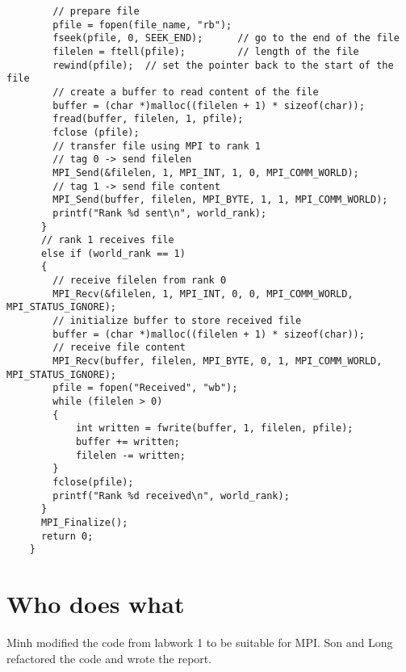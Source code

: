 \documentclass[12pt]{article}
\begin{document}
\begin{verbatim}
        // prepare file
        pfile = fopen(file_name, "rb");
        fseek(pfile, 0, SEEK_END);      // go to the end of the file
        filelen = ftell(pfile);         // length of the file
        rewind(pfile);  // set the pointer back to the start of the file 
        // create a buffer to read content of the file
        buffer = (char *)malloc((filelen + 1) * sizeof(char)); 
        fread(buffer, filelen, 1, pfile);
        fclose (pfile); 
        // transfer file using MPI to rank 1
        // tag 0 -> send filelen 
        MPI_Send(&filelen, 1, MPI_INT, 1, 0, MPI_COMM_WORLD);
        // tag 1 -> send file content
        MPI_Send(buffer, filelen, MPI_BYTE, 1, 1, MPI_COMM_WORLD);
        printf("Rank %d sent\n", world_rank);
      }
      // rank 1 receives file 
      else if (world_rank == 1)
      {
        // receive filelen from rank 0
        MPI_Recv(&filelen, 1, MPI_INT, 0, 0, MPI_COMM_WORLD, MPI_STATUS_IGNORE);
        // initialize buffer to store received file 
        buffer = (char *)malloc((filelen + 1) * sizeof(char));
        // receive file content
        MPI_Recv(buffer, filelen, MPI_BYTE, 0, 1, MPI_COMM_WORLD, MPI_STATUS_IGNORE);
        pfile = fopen("Received", "wb");
        while (filelen > 0)
        {
            int written = fwrite(buffer, 1, filelen, pfile);
            buffer += written;
            filelen -= written;
        }
        fclose(pfile);
        printf("Rank %d received\n", world_rank);
      }
      MPI_Finalize();
      return 0;
    }
    \end{verbatim}
  
    \section{Who does what}
    Minh modified the code from labwork 1 to be suitable for MPI. Son and Long refactored the code and wrote the report.
\end{document}

